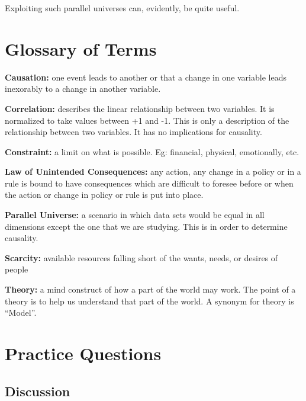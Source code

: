 \documentclass[
]{book}
\begin{document}
Exploiting such parallel universes can, evidently, be quite useful.

\hypertarget{glossary-of-terms}{%
\section{Glossary of Terms}\label{glossary-of-terms}}

\textbf{Causation:} one event leads to another or that a change in one variable leads inexorably to a change in another variable.

\textbf{Correlation:} describes the linear relationship between two variables. It is normalized to take values between +1 and -1. This is only a description of the relationship between two variables. It has no implications for causality.

\textbf{Constraint:} a limit on what is possible. Eg: financial, physical, emotionally, etc.

\textbf{Law of Unintended Consequences:} any action, any change in a policy or in a rule is bound to have consequences which are difficult to foresee before or when the action or change in policy or rule is put into place.

\textbf{Parallel Universe:} a scenario in which data sets would be equal in all dimensions except the one that we are studying. This is in order to determine causality.

\textbf{Scarcity:} available resources falling short of the wants, needs, or desires of people

\textbf{Theory:} a mind construct of how a part of the world may work. The point of a theory is to help us understand that part of the world. A synonym for theory is ``Model''.

\hypertarget{practice-questions}{%
\section{Practice Questions}\label{practice-questions}}

\hypertarget{discussion}{%
\subsection{Discussion}\label{discussion}}
\end{document}
